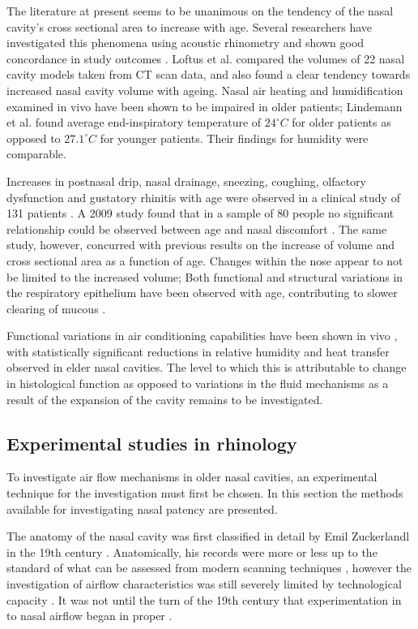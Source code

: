 The literature at present seems to be unanimous on the tendency of the nasal cavity's cross sectional area to increase with age. Several researchers have investigated this phenomena using acoustic rhinometry and shown good concordance in study outcomes \cite{Kalmovich2005, Edelstein1996,WhanKim2007,Lindemann2008}. Loftus et al. \cite{Loftus2016} compared the volumes of 22 nasal cavity models taken from CT scan data, and also found a clear tendency towards increased nasal cavity volume with ageing. Nasal air heating and humidification examined in vivo have been shown to be impaired in older patients; Lindemann et al. \cite{Lindemann2008} found average end-inspiratory temperature of $24^{\circ}C$ for older  patients as opposed to $27.1^{\circ}C$ for younger patients. Their findings for humidity were comparable. 

Increases in postnasal drip, nasal drainage, sneezing, coughing, olfactory dysfunction and gustatory rhinitis with age were observed in a clinical study of 131 patients \cite{Edelstein1996}. A 2009 study found that in a sample of 80 people no significant relationship could be observed between age and nasal discomfort \cite{Lindemann2010}. The same study, however, concurred with previous results on the increase of volume and cross sectional area as a function of age. Changes within the nose appear to not be limited to the increased volume; Both functional and structural variations in the respiratory epithelium have been observed with age, contributing to slower clearing of mucous \cite{HO2001}. 

Functional variations in air conditioning capabilities have been shown in vivo \cite{Lindemann2008}, with statistically significant reductions in relative humidity and heat transfer observed in elder nasal cavities. The level to which this is attributable to change in histological function as opposed to variations in the fluid mechanisms as a result of the expansion of the cavity remains to be investigated.

 \subsection{Experimental studies in rhinology}
 
To investigate air flow mechanisms in older nasal cavities, an experimental technique for the investigation must first be chosen. In this section the methods available for investigating nasal patency are presented.

The anatomy of the nasal cavity was first classified in detail by Emil Zuckerlandl in the 19th century \cite{Stammberger1989}. Anatomically, his records were more or less up to the standard of what can be assessed from modern scanning techniques \cite{Stammberger1989}, however the investigation of airflow characteristics was still severely limited by technological capacity \cite{Eccles2000}. It was not until the turn of the 19th century that experimentation in to nasal airflow began in proper \cite{Eccles2000}. 

